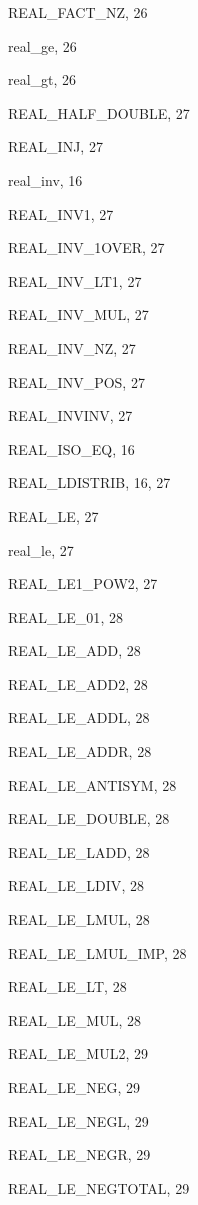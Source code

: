 \begin{theindex}
  \item {\ptt REAL\_FACT\_NZ}, 26
  \item {\ptt real\_ge}, 26
  \item {\ptt real\_gt}, 26
  \item {\ptt REAL\_HALF\_DOUBLE}, 27
  \item {\ptt REAL\_INJ}, 27
  \item {\ptt real\_inv}, 16
  \item {\ptt REAL\_INV1}, 27
  \item {\ptt REAL\_INV\_1OVER}, 27
  \item {\ptt REAL\_INV\_LT1}, 27
  \item {\ptt REAL\_INV\_MUL}, 27
  \item {\ptt REAL\_INV\_NZ}, 27
  \item {\ptt REAL\_INV\_POS}, 27
  \item {\ptt REAL\_INVINV}, 27
  \item {\ptt REAL\_ISO\_EQ}, 16
  \item {\ptt REAL\_LDISTRIB}, 16, 27
  \item {\ptt REAL\_LE}, 27
  \item {\ptt real\_le}, 27
  \item {\ptt REAL\_LE1\_POW2}, 27
  \item {\ptt REAL\_LE\_01}, 28
  \item {\ptt REAL\_LE\_ADD}, 28
  \item {\ptt REAL\_LE\_ADD2}, 28
  \item {\ptt REAL\_LE\_ADDL}, 28
  \item {\ptt REAL\_LE\_ADDR}, 28
  \item {\ptt REAL\_LE\_ANTISYM}, 28
  \item {\ptt REAL\_LE\_DOUBLE}, 28
  \item {\ptt REAL\_LE\_LADD}, 28
  \item {\ptt REAL\_LE\_LDIV}, 28
  \item {\ptt REAL\_LE\_LMUL}, 28
  \item {\ptt REAL\_LE\_LMUL\_IMP}, 28
  \item {\ptt REAL\_LE\_LT}, 28
  \item {\ptt REAL\_LE\_MUL}, 28
  \item {\ptt REAL\_LE\_MUL2}, 29
  \item {\ptt REAL\_LE\_NEG}, 29
  \item {\ptt REAL\_LE\_NEGL}, 29
  \item {\ptt REAL\_LE\_NEGR}, 29
  \item {\ptt REAL\_LE\_NEGTOTAL}, 29

\end{theindex}
